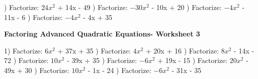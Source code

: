 \documentclass{article}%
\begin{document}
) Factorize: $24x^2$ + 14x - 49%
\newline%
\newline%
) Factorize: $-30x^2$ - 10x + 20%
\newline%
\newline%
) Factorize: $-4x^2$ - 11x - 6%
\newline%
\newline%
) Factorize: $-4x^2$ - 4x + 35%
\newline%
\newline%
\newline%
\pagebreak%
\large%
\begin{center}%
\textbf{Factoring Advanced Quadratic Equations- Worksheet 3}%
\newline%
\newline%
\newline%
\end{center} \normalsize%
1) Factorize: $6x^2$ + 37x + 35%
\newline%
\newline%
) Factorize: $4x^2$ + 20x + 16%
\newline%
\newline%
) Factorize: $8x^2$ - 14x - 72%
\newline%
\newline%
) Factorize: $10x^2$ - 39x + 35%
\newline%
\newline%
) Factorize: $-6x^2$ + 19x - 15%
\newline%
\newline%
) Factorize: $20x^2$ - 49x + 30%
\newline%
\newline%
) Factorize: $10x^2$ - 1x - 24%
\newline%
\newline%
) Factorize: $-6x^2$ - 31x - 35%
\newline%
\newline%
\newline%
\end{document}
